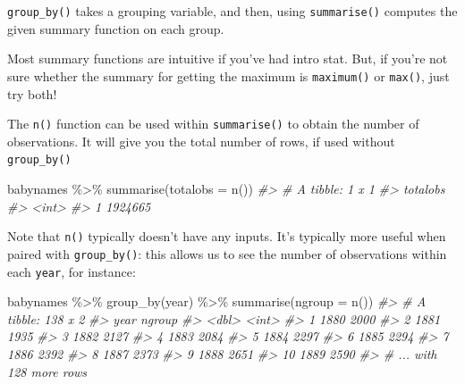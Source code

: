 \documentclass[
]{book}
\newenvironment{Shaded}{\begin{snugshade}}{\end{snugshade}}
\newcommand{\AttributeTok}[1]{\textcolor[rgb]{0.77,0.63,0.00}{#1}}
\newcommand{\CommentTok}[1]{\textcolor[rgb]{0.56,0.35,0.01}{\textit{#1}}}
\newcommand{\FunctionTok}[1]{\textcolor[rgb]{0.00,0.00,0.00}{#1}}
\newcommand{\NormalTok}[1]{#1}
\newcommand{\SpecialCharTok}[1]{\textcolor[rgb]{0.00,0.00,0.00}{#1}}
\begin{document}
\texttt{group\_by()} takes a grouping variable, and then, using \texttt{summarise()} computes the given summary function on each group.

Most summary functions are intuitive if you've had intro stat. But, if you're not sure whether the summary for getting the maximum is \texttt{maximum()} or \texttt{max()}, just try both!

The \texttt{n()} function can be used within \texttt{summarise()} to obtain the number of observations. It will give you the total number of rows, if used without \texttt{group\_by()}

\begin{Shaded}
\begin{Highlighting}[]
\NormalTok{babynames }\SpecialCharTok{\%\textgreater{}\%} \FunctionTok{summarise}\NormalTok{(}\AttributeTok{totalobs =} \FunctionTok{n}\NormalTok{())}
\CommentTok{\#\textgreater{} \# A tibble: 1 x 1}
\CommentTok{\#\textgreater{}   totalobs}
\CommentTok{\#\textgreater{}      \textless{}int\textgreater{}}
\CommentTok{\#\textgreater{} 1  1924665}
\end{Highlighting}
\end{Shaded}

Note that \texttt{n()} typically doesn't have any inputs. It's typically more useful when paired with \texttt{group\_by()}: this allows us to see the number of observations within each \texttt{year}, for instance:

\begin{Shaded}
\begin{Highlighting}[]
\NormalTok{babynames }\SpecialCharTok{\%\textgreater{}\%} \FunctionTok{group\_by}\NormalTok{(year) }\SpecialCharTok{\%\textgreater{}\%}
  \FunctionTok{summarise}\NormalTok{(}\AttributeTok{ngroup =} \FunctionTok{n}\NormalTok{())}
\CommentTok{\#\textgreater{} \# A tibble: 138 x 2}
\CommentTok{\#\textgreater{}     year ngroup}
\CommentTok{\#\textgreater{}    \textless{}dbl\textgreater{}  \textless{}int\textgreater{}}
\CommentTok{\#\textgreater{}  1  1880   2000}
\CommentTok{\#\textgreater{}  2  1881   1935}
\CommentTok{\#\textgreater{}  3  1882   2127}
\CommentTok{\#\textgreater{}  4  1883   2084}
\CommentTok{\#\textgreater{}  5  1884   2297}
\CommentTok{\#\textgreater{}  6  1885   2294}
\CommentTok{\#\textgreater{}  7  1886   2392}
\CommentTok{\#\textgreater{}  8  1887   2373}
\CommentTok{\#\textgreater{}  9  1888   2651}
\CommentTok{\#\textgreater{} 10  1889   2590}
\CommentTok{\#\textgreater{} \# ... with 128 more rows}
\end{Highlighting}
\end{Shaded}
\end{document}
